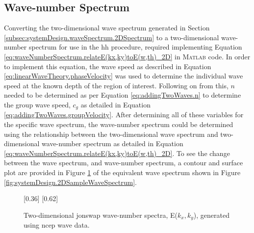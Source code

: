 

\subsection{Wave-number Spectrum} \label{subsec:systemDesign.waveSpectrum.waveNumberSpectrum}

Converting the two-dimensional wave spectrum generated in Section \ref{subsec:systemDesign.waveSpectrum.2DSpectrum} to a two-dimensional wave-number spectrum for use in the \ac{hh} procedure, required implementing Equation \ref{eq:waveNumberSpectrum.relateE(kx,ky)toE(w,th)_2D} in \textsc{Matlab} code. In order to implement this equation, the wave speed as described in Equation \ref{eq:linearWaveTheory.phaseVelocity} was used to determine the individual wave speed at the known depth of the region of interest. Following on from this, $n$ needed to be determined as per Equation \ref{eq:addingTwoWaves.n} to determine the group wave speed, $c_{g}$ as detailed in Equation \ref{eq:addingTwoWaves.groupVelocity}. After determining all of these variables for the specific wave spectrum, the wave-number spectrum could be determined using the relationship between the two-dimensional wave spectrum and two-dimensional wave-number spectrum as detailed in Equation \ref{eq:waveNumberSpectrum.relateE(kx,ky)toE(w,th)_2D}. To see the change between the wave spectrum, and wave-number spectrum, a contour and surface plot are provided in Figure \ref{fig:systemDesign.2DSampleWaveNumSpectrum} of the equivalent wave spectrum shown in Figure \ref{fig:systemDesign.2DSampleWaveSpectrum}.

\begin{figure} [H]
    \centering
    [0.36\linewidth]{
        \resizebox{\linewidth}{!}{}
    }
    [0.62\linewidth]{
        \resizebox{\linewidth}{!}{}
    }
    \caption{Two-dimensional \acs{jonswap} wave-number spectra, E($k_{x},k_{y}$), generated using \acs{ncep} wave data.}
    \label{fig:systemDesign.2DSampleWaveNumSpectrum}
\end{figure}


